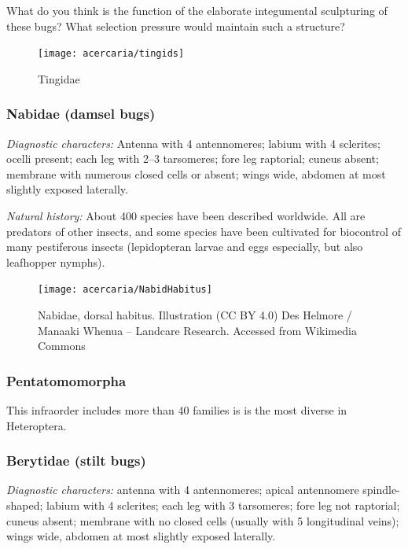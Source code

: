 \begin{theo}
{}What do you think is the function of the elaborate integumental sculpturing of these bugs? What selection pressure would maintain such a structure?
\end{theo}

\begin{figure}[ht!]
 \centering
 \texttt{[image: acercaria/tingids]}
 \caption{Tingidae \citep[][Fig. 38]{bhlitem45622}}
 \label{fig:tingid1}
\end{figure}

\subsubsection{Nabidae (damsel bugs)}%
\noindent{}\textit{Diagnostic characters:} Antenna with 4 antennomeres; labium with 4 sclerites; ocelli present; each leg with 2--3 tarsomeres; fore leg raptorial; cuneus absent; membrane with numerous closed cells or absent; wings wide, abdomen at most slightly exposed laterally.\vspace{3mm}

\noindent{}\textit{Natural history:} About 400 species have been described worldwide. All are predators of other insects, and some species have been cultivated for biocontrol of many pestiferous insects (lepidopteran larvae and eggs especially, but also leafhopper nymphs).\vspace{3mm}

\begin{figure}[ht!]
 \centering
    \texttt{[image: acercaria/NabidHabitus]}
 \caption{Nabidae, dorsal habitus. Illustration (CC BY 4.0) Des Helmore / Manaaki Whenua – Landcare Research. Accessed from Wikimedia Commons}
 \label{fig:nabid1}
\end{figure}

\subsubsection{Pentatomomorpha}
This infraorder includes more than 40 families is is the most diverse in Heteroptera.
\subsubsection{Berytidae (stilt bugs)}
\noindent{}\textit{Diagnostic characters:} antenna with 4 antennomeres; apical antennomere spindle-shaped; labium with 4 sclerites; each leg with 3 tarsomeres; fore leg not raptorial; cuneus absent; membrane with no closed cells (usually with 5 longitudinal veins); wings wide, abdomen at most slightly exposed laterally.\vspace{3mm}

